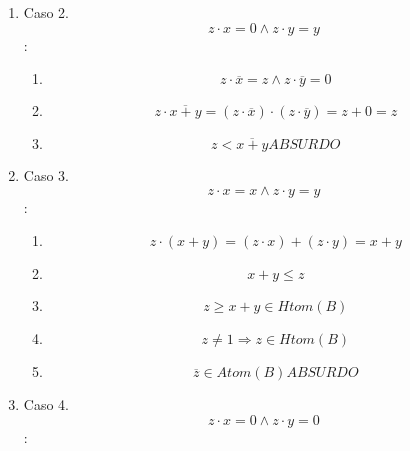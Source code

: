 \documentclass[
]{article}
\providecommand{\tightlist}{%
  \setlength{\itemsep}{0pt}\setlength{\parskip}{0pt}}
\begin{document}
\begin{enumerate}
\begin{enumerate}
\begin{enumerate}
\begin{enumerate}
\begin{enumerate}
\begin{enumerate}
            \begin{enumerate}
            \def\labelenumvii{\arabic{enumvii}.}
            \tightlist
            \item
              \[{{z \cdot \overline{x}} = {{0 \land z} \cdot \overline{y}}} = z\]
            \item
              \[{{{z \cdot \overline{x+y}} = {{({z \cdot \overline{x}})} \cdot {({z \cdot \overline{y}})}}} = {0 + z}} = z\]
            \item
              \[{z < \overline{x+y}}\mathit{ABSURDO}\]
            \end{enumerate}
          \item
            Caso 2. \[{{z \cdot x} = {{0 \land z} \cdot y}} = y\]:

            \begin{enumerate}
            \def\labelenumvii{\arabic{enumvii}.}
            \tightlist
            \item
              \[{{z \cdot \overline{x}} = {{z \land z} \cdot \overline{y}}} = 0\]
            \item
              \[{{{z \cdot \overline{x+y}} = {{({z \cdot \overline{x}})} \cdot {({z \cdot \overline{y}})}}} = {z + 0}} = z\]
            \item
              \[{z < \overline{x+y}}\mathit{ABSURDO}\]
            \end{enumerate}
          \item
            Caso 3.\[{{z \cdot x} = {{x \land z} \cdot y}} = y\]:

            \begin{enumerate}
            \def\labelenumvii{\arabic{enumvii}.}
            \tightlist
            \item
              \[{{z \cdot {({x + y})}} = {{({z \cdot x})} + {({z \cdot y})}}} = {x + y}\]
            \item
              \[{x + y} \leq z\]
            \item
              \[{{z \geq {x + y}} \in \mathit{Htom}}{(B)}\]
            \item
              \[{z \neq 1}\Rightarrow{z \in \mathit{Htom}}{(B)}\]
            \item
              \[{\overline{z} \in \mathit{Atom}}{(B)}\mathit{ABSURDO}\]
            \end{enumerate}
          \item
            Caso 4.\[{{z \cdot x} = {{0 \land z} \cdot y}} = 0\]:


\end{enumerate}
\end{enumerate}
\end{enumerate}
\end{enumerate}
\end{enumerate}
\end{enumerate}
\end{document}
